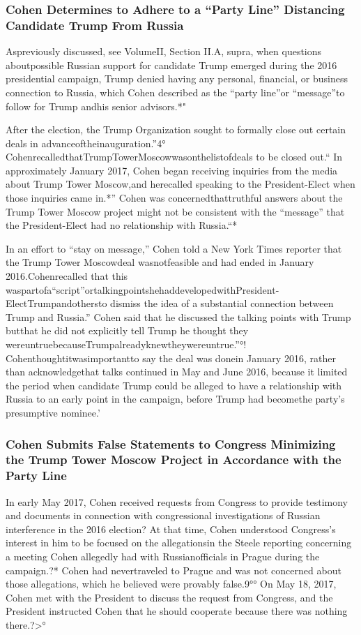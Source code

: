 \subsubsection{Cohen Determines to Adhere to a “Party Line” Distancing Candidate Trump From Russia}

Aspreviously discussed, see VolumeII, Section II.A, supra, when questions aboutpossible Russian support for candidate Trump emerged during the 2016 presidential campaign, Trump denied having any personal, financial, or business connection to Russia, which Cohen described as the “party line”or “message”to follow for Trump andhis senior advisors.*"

After the election, the Trump Organization sought to formally close out certain deals in advanceoftheinauguration.”4° CohenrecalledthatTrumpTowerMoscowwasonthelistofdeals to be closed out.“ In approximately January 2017, Cohen began receiving inquiries from the media about Trump Tower Moscow,and herecalled speaking to the President-Elect when those inquiries came in.*” Cohen was concernedthattruthful answers about the Trump Tower Moscow project might not be consistent with the “message” that the President-Elect had no relationship with Russia.“*

In an effort to “stay on message,” Cohen told a New York Times reporter that the Trump Tower Moscowdeal wasnotfeasible and had ended in January 2016.Cohenrecalled that this waspartofa“script”ortalkingpointshehaddevelopedwithPresident-ElectTrumpandothersto
dismiss the idea of a substantial connection between Trump and Russia.” Cohen said that he discussed the talking points with Trump butthat he did not explicitly tell Trump he thought they wereuntruebecauseTrumpalreadyknewtheywereuntrue.”°! Cohenthoughtitwasimportantto say the deal was donein January 2016, rather than acknowledgethat talks continued in May and June 2016, because it limited the period when candidate Trump could be alleged to have a relationship with Russia to an early point in the campaign, before Trump had becomethe party’s presumptive nominee.’

\subsubsection{Cohen Submits False Statements to Congress Minimizing the Trump Tower Moscow Project in Accordance with the Party Line}

In early May 2017, Cohen received requests from Congress to provide testimony and documents in connection with congressional investigations of Russian interference in the 2016 election? At that time, Cohen understood Congress’s interest in him to be focused on the allegationsin the Steele reporting concerning a meeting Cohen allegedly had with Russianofficials in Prague during the campaign.?* Cohen had nevertraveled to Prague and was not concerned about those allegations, which he believed were provably false.9°° On May 18, 2017, Cohen met with the President to discuss the request from Congress, and the President instructed Cohen that he should cooperate because there was nothing there.?>°

